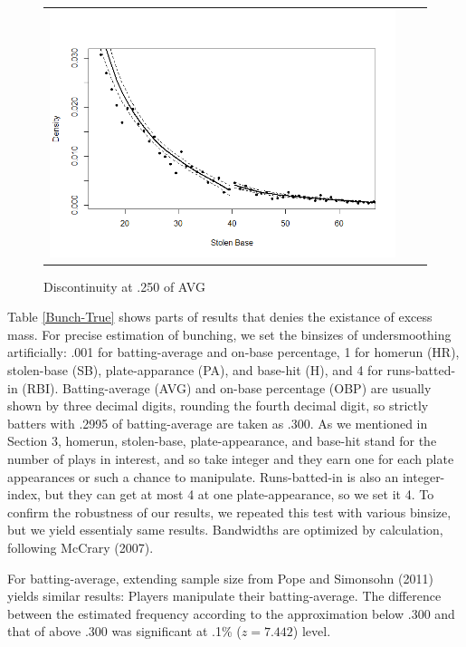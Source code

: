 \documentclass[dvipdfmx, 12pt]{article}
\begin{document}
\begin{figure}
\begin{tabular}{ccc}
          \multicolumn{1}{r}{
          \begin{minipage}{.4\textwidth}
            \includegraphics[keepaspectratio, scale = 0.5, angle = 0]{graphs/SB_40.png}
            \caption{Discontinuity at .250 of AVG}
            \label{DCdensity_SB_40}
          \end{minipage}
          }
        \end{tabular}
      \end{figure}

Table \ref{Bunch-True} shows parts of results that denies the existance of excess mass. For precise estimation of bunching, we set the binsizes of undersmoothing artificially: .001 for batting-average and on-base percentage, 1 for homerun (HR), stolen-base (SB), plate-apparance (PA), and base-hit (H), and 4 for runs-batted-in (RBI). Batting-average (AVG) and on-base percentage (OBP) are usually shown by three decimal digits, rounding the fourth decimal digit, so strictly batters with .2995 of batting-average are taken as .300. As we mentioned in Section 3, homerun, stolen-base, plate-appearance, and base-hit stand for the number of plays in interest, and so take integer and they earn one for each plate appearances or such a chance to manipulate. Runs-batted-in is also an integer-index, but they can get at most 4 at one plate-appearance, so we set it 4. To confirm the robustness of our results, we repeated this test with various binsize, but we yield essentialy same results. Bandwidths are optimized by calculation, following McCrary (2007).


For batting-average, extending sample size from Pope and Simonsohn (2011) yields similar results: Players manipulate their batting-average. The difference between the estimated frequency according to the approximation below .300 and that of above .300 was significant at .1\% ($z=7.442$) level.
\end{document}
